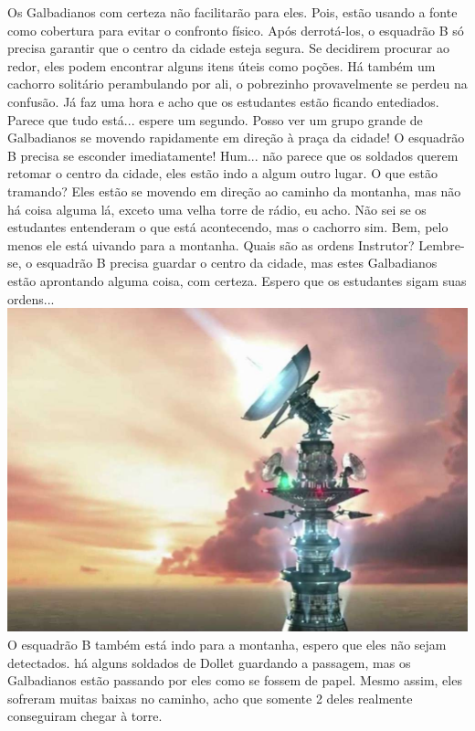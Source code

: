 %
\vfill
%
Os Galbadianos com certeza não facilitarão para eles. Pois, estão usando a fonte como cobertura para evitar o confronto físico. Após derrotá-los, o esquadrão B só precisa garantir que o centro da cidade esteja segura.
Se decidirem procurar ao redor, eles podem encontrar alguns itens úteis como poções.
Há também um cachorro solitário perambulando por ali, o pobrezinho provavelmente se perdeu na confusão.
Já faz uma hora e acho que os estudantes estão ficando entediados.
Parece que tudo está... espere um segundo.
Posso ver um grupo grande de Galbadianos se movendo rapidamente em direção à praça da cidade!
O esquadrão B precisa se esconder imediatamente!
Hum... não parece que os soldados querem retomar o centro da cidade, eles estão indo a algum outro lugar.
O que estão tramando?
%
\vfill
%
Eles estão se movendo em direção ao caminho da montanha, mas não há coisa alguma lá, exceto uma velha torre de rádio, eu acho.
Não sei se os estudantes entenderam o que está acontecendo, mas o cachorro sim.
Bem, pelo menos ele está uivando para a montanha.
Quais são as ordens Instrutor?
Lembre-se, o esquadrão B precisa guardar o centro da cidade, mas estes Galbadianos estão aprontando alguma coisa, com certeza.
Espero que os estudantes sigam suas ordens...
%
\clearpage
%
%
\vfill
%
\includegraphics[width=\columnwidth]{./art/siegeofdollet/tower.jpg}
%
\vfill
%
O esquadrão B também está indo para a montanha, espero que eles não sejam detectados. há alguns soldados de Dollet guardando a passagem, mas os Galbadianos estão passando por eles como se fossem de papel.
Mesmo assim, eles sofreram muitas baixas no caminho, acho que somente 2 deles realmente conseguiram chegar à torre.
